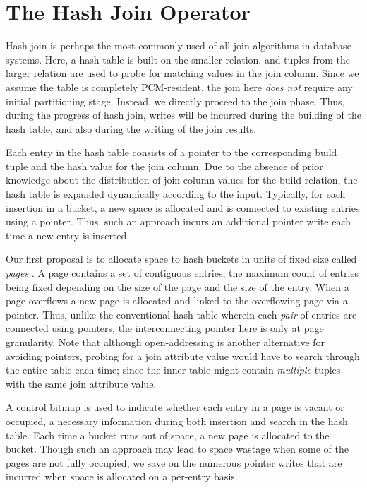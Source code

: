 \section{The Hash Join Operator}
\label{hj}
Hash join is perhaps the most commonly used of all join algorithms in
database systems. Here, a hash table is built on the smaller relation,
and tuples from the larger relation are used to probe for matching values
in the join column. Since we assume the table is completely PCM-resident, the join here \emph{does not} require any initial partitioning stage. Instead, we directly proceed to the join phase. Thus, during the progress of hash join,
writes will be incurred during the building of the hash table, and also
during the writing of the join results.

Each entry in the hash table consists of a pointer to the corresponding
build tuple and the hash value for the join column. Due to the
absence of prior knowledge about the distribution of join column values
for the build relation, the hash table is expanded dynamically according
to the input. Typically, for each insertion in a bucket, a new space is
allocated and is connected to existing entries using a pointer. Thus,
such an approach incurs an additional pointer write each time a new
entry is inserted.

Our first proposal is to allocate space to hash buckets in units of
fixed size called \textit{pages} \cite{paging}. A page contains a set of contiguous
entries, the maximum count of entries being fixed depending on the size
of the page and the size of the entry. When a page overflows a new page
is allocated and linked to the overflowing page via a pointer.  Thus,
unlike the conventional hash table wherein each \emph{pair} of entries
are connected using pointers, the interconnecting pointer here is only
at page granularity. Note that although open-addressing is another alternative for avoiding pointers, probing for a join attribute value would have to search through the entire table each time; since the inner table might contain \emph{multiple} tuples with the same join attribute value.

A control bitmap is used to indicate whether each entry in a page is vacant
or occupied, a necessary information during both insertion and search in the
hash table. Each time a bucket runs out of space, a new page is allocated
to the bucket. Though such an approach  may lead to space wastage when
some of the pages are not fully occupied, we save on the numerous pointer
writes that are incurred when space is allocated on a per-entry basis.

